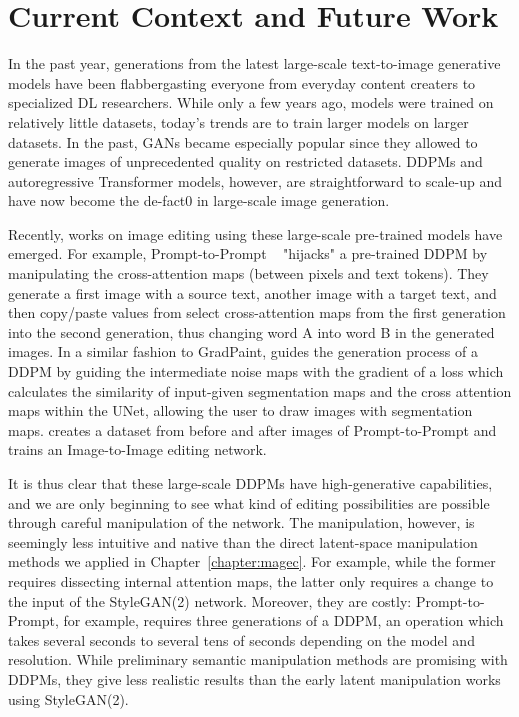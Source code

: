 \section{Current Context and Future Work}
In the past year, generations from the latest large-scale text-to-image generative models have been flabbergasting 
everyone from everyday content creaters to specialized \ac{DL} researchers. While only a few years ago, models were 
trained on relatively little datasets, today's trends are to train larger models on larger datasets. 
In the past, \ac{GAN}s became especially popular since they allowed to generate images of unprecedented quality on restricted datasets.
\ac{DDPM}s and autoregressive Transformer models, however, are straightforward to scale-up and have now become the de-fact0 in large-scale 
 image generation.

 Recently, works on image editing using these large-scale pre-trained models have emerged. For example, Prompt-to-Prompt 
~\citep{hertz2022prompt} "hijacks" a pre-trained \ac{DDPM} by manipulating the cross-attention maps 
 (between pixels and text tokens). They generate a first image with a source text, another image 
 with a target text, and then copy/paste values from select cross-attention maps from the first generation into the second generation, thus 
 changing word A into word B in the generated images. In a similar fashion to GradPaint, \cite{zestguide2023} guides the generation 
 process of a \ac{DDPM} by guiding the intermediate noise maps with the gradient of a loss which 
 calculates the similarity of input-given segmentation maps and the cross attention maps within the UNet, allowing the user
 to draw images with segmentation maps. \cite{brooks2022instructpix2pix} creates a dataset from before and after images of Prompt-to-Prompt and trains an 
 Image-to-Image editing network. 
 
It is thus clear that these large-scale \ac{DDPM}s have high-generative capabilities, and we are only beginning to see what kind of editing 
possibilities are possible through careful manipulation of the network. The manipulation, however, is seemingly less intuitive and native than the 
direct latent-space manipulation methods we applied in Chapter~\ref{chapter:magec}. For example, while the former requires dissecting internal attention maps, 
the latter only requires a change to the input of the StyleGAN(2) network. Moreover, they are costly: Prompt-to-Prompt, for example, requires 
three generations of a \ac{DDPM}, an operation which takes several seconds to several tens of seconds depending on the model and resolution.   While preliminary semantic manipulation methods are promising with \ac{DDPM}s, 
they give less realistic results than the early latent manipulation works using StyleGAN(2). 

